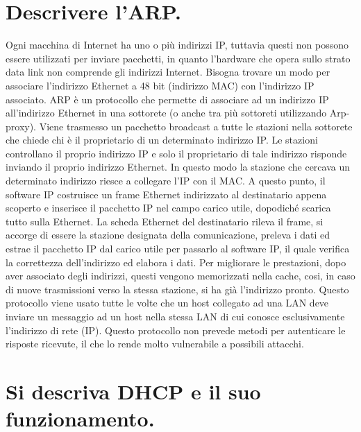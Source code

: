 \section{Descrivere l’ARP.}

Ogni macchina di Internet ha uno o più indirizzi IP, tuttavia questi non possono essere utilizzati per inviare pacchetti, in quanto l’hardware che opera sullo strato data link non comprende gli indirizzi Internet.
Bisogna trovare un modo per associare l’indirizzo Ethernet a 48 bit (indirizzo MAC) con l’indirizzo IP associato.
ARP è un protocollo che permette di associare ad un indirizzo IP all’indirizzo Ethernet in una sottorete (o anche tra più sottoreti utilizzando Arp-proxy).
Viene trasmesso un pacchetto broadcast a tutte le stazioni nella sottorete che chiede chi è il proprietario di un determinato indirizzo IP. Le stazioni controllano il proprio indirizzo IP e solo il proprietario di tale indirizzo risponde inviando il proprio indirizzo Ethernet. In questo modo la stazione che cercava un determinato indirizzo riesce a collegare l’IP con il MAC.
A questo punto, il software IP costruisce un frame Ethernet indirizzato al destinatario appena scoperto e inserisce il pacchetto IP nel campo carico utile, dopodiché scarica tutto sulla Ethernet. 
La scheda Ethernet del destinatario rileva il frame, si accorge di essere la stazione designata della comunicazione, preleva i dati ed estrae il pacchetto IP dal carico utile per passarlo al software IP, il quale verifica la correttezza dell’indirizzo ed elabora i dati.
Per migliorare le prestazioni, dopo aver associato degli indirizzi, questi vengono memorizzati nella cache, cosi, in caso di nuove trasmissioni verso la stessa stazione, si ha già l’indirizzo pronto.
Questo protocollo viene usato tutte le volte che un host collegato ad una LAN deve inviare un messaggio ad un host nella stessa LAN di cui conosce esclusivamente l’indirizzo di rete (IP).
Questo protocollo non prevede metodi per autenticare le risposte ricevute, il che lo rende molto vulnerabile a possibili attacchi.

\section{Si descriva DHCP e il suo funzionamento.}

